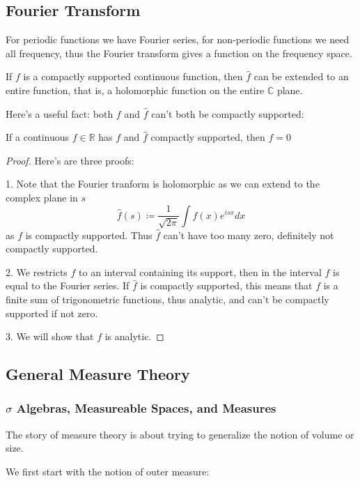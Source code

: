 \documentclass[main.tex]{subfiles}
\begin{document}
\subsection{Fourier Transform}
For periodic functions we have Fourier series, for non-periodic functions we need all frequency, thus the Fourier transform gives a function on the frequency space.

If $f$ is a compactly supported continuous function, then $\hat{f}$ can be extended to an entire function, that is, a holomorphic function on the entire $\mathbb{C}$ plane.

Here's a useful fact: both $f$ and $\hat{f}$ can't both be compactly supported:

\begin{theorem}
If a continuous $f \in \mathbb{R}$ has $f$ and $\hat{f}$ compactly supported, then $f = 0$
\end{theorem}

\begin{proof}
Here's are three proofs:

1. Note that the Fourier tranform is holomorphic as we can extend to the complex plane in $s$
$$
\hat{f}(s) \coloneqq \frac{1}{\sqrt{2\pi}} \int f(x) e^{isx} dx
$$
as $f$ is compactly supported. Thus $\hat{f}$ can't have too many zero, definitely not compactly supported.

2. We restricts $f$ to an interval containing its support, then in the interval $f$ is equal to the Fourier series. If $\hat{f}$ is compactly supported, this means that $f$ is a finite sum of trigonometric functions, thus analytic, and can't be compactly supported if not zero.

3. We will show that $f$ is analytic. 
\end{proof}



\subsection{General Measure Theory}

\subsubsection{$\sigma$ Algebras, Measureable Spaces, and Measures}
The story of measure theory is about trying to generalize the notion of volume or size. 

We first start with the notion of outer measure:
\end{document}
